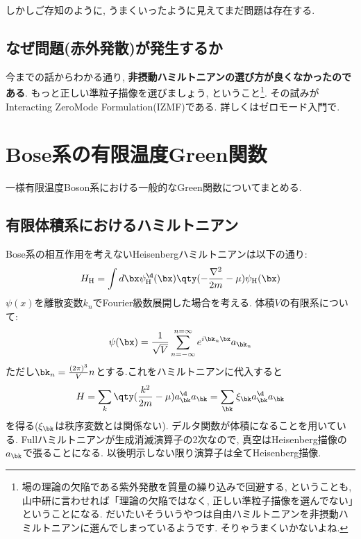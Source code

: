 \documentclass[10.5pt,a4paper]{jreport}
\begin{document}
しかしご存知のように, うまくいったように見えてまだ問題は存在する. 
\subsection{なぜ問題(赤外発散)が発生するか}
今までの話からわかる通り, \textbf{非摂動ハミルトニアンの選び方が良くなかったのである}.
もっと正しい準粒子描像を選びましょう, ということ\footnote{場の理論の欠陥である紫外発散を質量の繰り込みで回避する, ということも, 山中研に言わせれば「理論の欠陥ではなく, 正しい準粒子描像を選んでない」ということになる. だいたいそういうやつは自由ハミルトニアンを非摂動ハミルトニアンに選んでしまっているようです. そりゃうまくいかないよね. }. その試みがInteracting ZeroMode Formulation(IZMF)である. 詳しくはゼロモード入門で.

\section{Bose系の有限温度Green関数}
一様有限温度Boson系における一般的なGreen関数についてまとめる.
\subsection{有限体積系におけるハミルトニアン}
Bose系の相互作用を考えないHeisenbergハミルトニアンは以下の通り:
\begin{eqnarray}
  H_{\rm H} = \int d\bx \psi_{\rm H}^\d(\bx)\qty(-\frac{\nabla^2}{2m} - \mu)\psi_{\rm H}(\bx)
\end{eqnarray}
$\psi(x)$を離散変数$k_n$でFourier級数展開した場合を考える. 体積$V$の有限系について:
\begin{eqnarray}
  \psi(\bx) = \frac{1}{\sqrt{V}}\sum_{n=-\infty}^{n=\infty}e^{i{\bk}_n\bx}a_{{\bk}_n}
\end{eqnarray}
ただし${\bk}_n = \frac{(2\pi)^3}{V}n$とする.これをハミルトニアンに代入すると
\begin{eqnarray}
  H = \sum_k \qty(\frac{k^2}{2m} -\mu)a_{\bk}^\d a_{\bk} = \sum_{\bk} \xi_{\bk}a_{\bk}^\d a_{\bk}
\end{eqnarray}
を得る($\xi_{\bk}$は秩序変数とは関係ない). デルタ関数が体積になることを用いている. Fullハミルトニアンが生成消滅演算子の2次なので, 真空はHeisenberg描像の$a_{\bk}$で張ることになる. 以後明示しない限り演算子は全てHeisenberg描像. 
\end{document}
